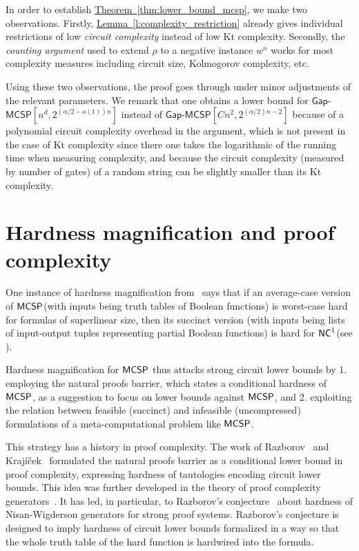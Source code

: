 \documentclass[11pt]{article}
\numberwithin{equation}{section}
\theoremstyle{definition}
\theoremstyle{plain}
\newcommand{\expref}[2]{\hyperref[#2]{#1~\ref{#2}}}
\newcommand{\NC}{\ensuremath{{\sf NC}^1}\xspace}
\newcommand{\MCSP}{\ensuremath{{\sf MCSP}}\xspace}
\newcommand{\gapmcsp}{\mathsf{Gap}$-$\mathsf{MCSP}}
\begin{document}
In order to establish \expref{Theorem}{thm:lower_bound_mcsp}, we make two observations. Firstly, \expref{Lemma}{l:complexity_restriction} already gives individual restrictions of low \emph{circuit complexity} instead of low Kt complexity. Secondly, the \emph{counting argument} used to extend $\rho$ to a negative instance $w^n$ works for most complexity measures including circuit size, Kolmogorov complexity, etc. 

Using these two observations, the proof goes through under minor adjustments of the relevant parameters. We remark that one obtains a lower bound for $\gapmcsp[n^d, 2^{(\alpha/2 - o(1))n}]$ instead of $\gapmcsp[Cn^2, 2^{(\alpha/2) n - 2}]$ because of a polynomial circuit complexity overhead in the argument, which is not present in the case of Kt complexity since there one takes the logarithmic of the running time when measuring complexity, and because the circuit complexity (measured by number of gates) of a random string can be slightly smaller than its Kt complexity.



\section{Hardness magnification and proof complexity}\label{s:proof_complexity}


One instance of hardness magnification  
from~\cite{OS18} says that if an average-case version of \MCSP (with inputs being truth tables of Boolean functions) is worst-case hard for formulas of superlinear size, then its succinct version (with inputs being lists of input-output tuples representing partial Boolean functions) is hard for \NC (see \cite[Theorem 1]{OS18}). 

Hardness magnification for \MCSP thus attacks strong circuit lower bounds by 1. employing the natural proofs barrier, which states a conditional hardness of \MCSP, as a suggestion to focus on lower bounds against \MCSP, and 2. exploiting the relation %
between feasible (succinct) and infeasible (uncompressed) formulations of a meta-computational problem like \MCSP.

This strategy has a history in proof complexity. The work of Razborov~\cite{Rdisj, Rba} and Kraj\'{i}\v{c}ek~\cite{Kdphp} formulated the natural proofs barrier as a
%
conditional lower bound in proof complexity,
expressing hardness of tautologies encoding circuit lower bounds. This idea was further developed in the theory of proof complexity generators~\cite{Kwphp, ABRW}. It has led, in particular, to Razborov's conjecture~\cite{Rkdnf} about hardness of Nisan-Wigderson generators for strong proof systems. Razborov's conjecture is designed to imply hardness of circuit lower bounds formalized in a way so that the whole truth table of the hard function is hardwired into the formula.
\end{document}
